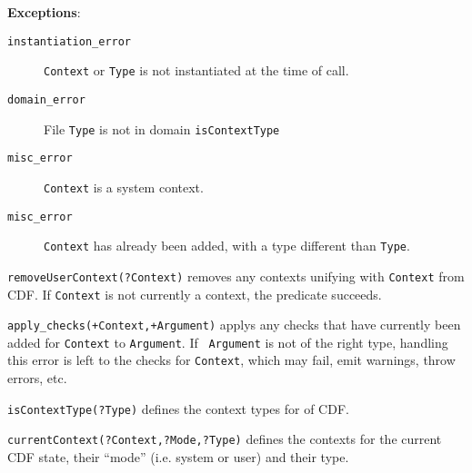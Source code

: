 \begin{description}
{\bf Exceptions}:
    \begin{description}
    \item[{\tt instantiation\_error}]
    	{\tt Context} or {\tt Type} is not instantiated at the time of call. 
    \item[{\tt domain\_error}]
    	File {\tt Type} is not in domain {\tt isContextType}
    \item[{\tt misc\_error}]
    	{\tt Context} is a system context.
    \item[{\tt misc\_error}]
    	{\tt Context} has already been added, with a type different
	    than {\tt Type}.
    \end{description}

{\tt removeUserContext(?Context)} removes any contexts unifying with
{\tt Context} from CDF.  If {\tt Context} is not currently a context,
the predicate succeeds.

{\tt apply\_checks(+Context,+Argument)} applys any checks that have
currently been added for {\tt Context} to {\tt Argument}.  If {\tt
Argument} is not of the right type, handling this error is left to the
checks for {\tt Context}, which may fail, emit warnings, throw errors,
etc.


{\tt isContextType(?Type)} defines the context types for \version{} of
CDF.

{\tt currentContext(?Context,?Mode,?Type)} defines the contexts for
the current CDF state, their ``mode'' (i.e. system or user) and their
type.
%
\end{description}
